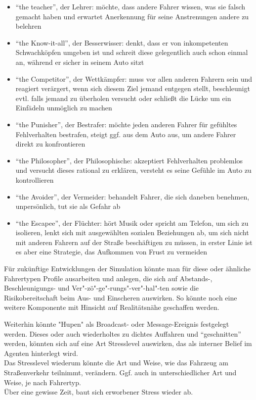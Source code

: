 \begin{itemize}
\itemsep0em
	\item \enquote{the teacher}, der Lehrer: möchte, dass andere Fahrer wissen, was sie falsch gemacht haben und erwartet Anerkennung für seine Anstrenungen andere zu belehren
	\item \enquote{the Know-it-all}, der Besserwisser: denkt, dass er von inkompetenten Schwachköpfen umgeben ist und schreit diese gelegentlich auch schon einmal an, während er sicher in seinem Auto sitzt
	\item \enquote{the Competitor}, der Wettkämpfer: muss vor allen anderen Fahrern sein und reagiert verärgert, wenn sich diesem Ziel jemand entgegen stellt, beschleunigt evtl. falls jemand zu überholen versucht oder schließt die Lücke um ein Einfädeln unmöglich zu machen
	\item \enquote{the Punisher}, der Bestrafer: möchte jeden anderen Fahrer für gefühltes Fehlverhalten bestrafen, steigt ggf. aus dem Auto aus, um andere Fahrer direkt zu konfrontieren
	\item \enquote{the Philosopher}, der Philosophische: akzeptiert Fehlverhalten problemlos und versucht dieses rational zu erklären, versteht es seine Gefühle im Auto zu kontrollieren
	\item \enquote{the Avoider}, der Vermeider: behandelt Fahrer, die sich daneben benehmen, unpersönlich, tut sie als Gefahr ab
	\item \enquote{the Escapee}, der Flüchter: hört Musik oder spricht am Telefon, um sich zu isolieren, lenkt sich mit ausgewählten sozialen Beziehungen ab, um sich nicht mit anderen Fahrern auf der Straße beschäftigen zu müssen, in erster Linie ist es aber eine Strategie, das Aufkommen von Frust zu vermeiden
\end{itemize}

Für zukünftige Entwicklungen der Simulation könnte man für diese oder ähnliche Fahrertypen Profile ausarbeiten und anlegen, die sich auf Abstands-, Beschleunigungs- und Ver"-zö"-ge"-rungs"-ver"-hal"-ten sowie die Risikobereitschaft beim Aus- und Einscheren auswirken.
So könnte noch eine weitere Komponente mit Hinsicht auf Realitätsnähe geschaffen werden. 

Weiterhin könnte "Hupen" als Broadcast- oder Message-Ereignis festgelegt werden.
Dieses oder auch wiederholtes zu dichtes Auffahren und \enquote{geschnitten} werden, könnten sich auf eine Art Stresslevel auswirken, das als interner Belief im Agenten hinterlegt wird.
\\
Das Stresslevel wiederum könnte die Art und Weise, wie das Fahrzeug am Straßenverkehr teilnimmt, verändern. 
Ggf. auch in unterschiedlicher Art und Weise, je nach Fahrertyp.
\\
Über eine gewisse Zeit, baut sich erworbener Stress wieder ab.

